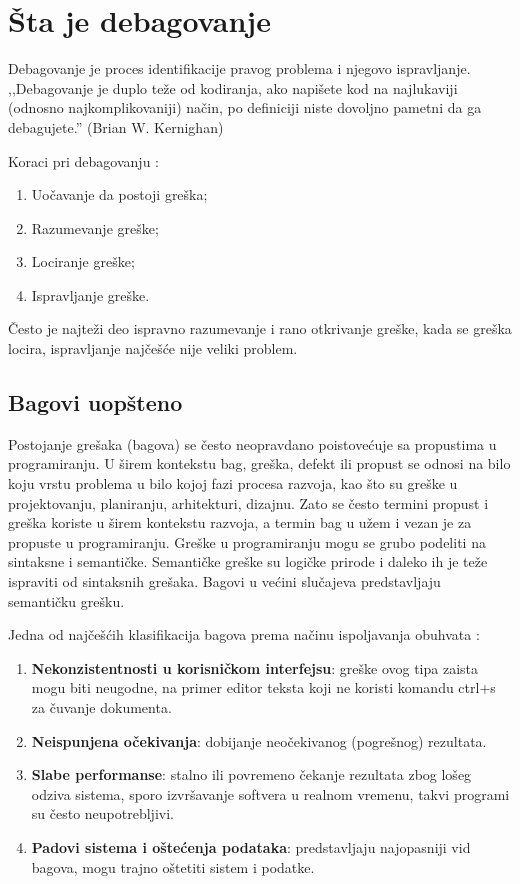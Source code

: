 \documentclass[a4paper]{article}
\begin{document}
\section{Šta je debagovanje}
\label{sec:sta je debagovanje}

Debagovanje je proces identifikacije pravog problema i njegovo ispravljanje.
,,Debagovanje je duplo teže od kodiranja, ako napišete kod na najlukaviji
(odnosno najkomplikovaniji) način, po definiciji niste dovoljno pametni da ga
debagujete.'' (Brian W. Kernighan) \cite{debagovanje_vladaf}


Koraci pri debagovanju \cite{bagovi_smalkov}:
\begin{enumerate}
\item Uočavanje da postoji greška;
\item Razumevanje greške;
\item Lociranje greške;
\item Ispravljanje greške.
\end{enumerate}

Često je najteži deo ispravno razumevanje i rano otkrivanje greške, kada se greška locira, ispravljanje najčešće nije veliki problem.


\subsection{Bagovi uopšteno}
\label{subsec:podnaslov1}

Postojanje grešaka (bagova) se često neopravdano poistovećuje sa propustima u programiranju.  U širem kontekstu bag, greška, defekt ili propust se odnosi na bilo koju vrstu problema u bilo kojoj fazi procesa razvoja, kao što su greške u projektovanju, planiranju, arhitekturi, dizajnu. Zato se često termini propust i greška koriste u širem kontekstu razvoja, a termin bag u užem i vezan je za propuste u programiranju. Greške u programiranju mogu se grubo podeliti na sintaksne i semantičke. Semantičke greške su logičke prirode i daleko ih je teže ispraviti od sintaksnih grešaka. Bagovi u većini slučajeva predstavljaju semantičku grešku.

Jedna od najčešćih klasifikacija bagova prema načinu ispoljavanja obuhvata \cite{bagovi_smalkov}:
\begin{enumerate}
	\item \textbf{Nekonzistentnosti u korisničkom interfejsu}: greške ovog tipa zaista mogu biti neugodne, na primer editor teksta koji ne koristi komandu ctrl+s za čuvanje dokumenta.
	\item \textbf{Neispunjena očekivanja}: dobijanje neočekivanog (pogrešnog) rezultata.
	\item \textbf{Slabe performanse}: stalno ili povremeno čekanje rezultata zbog lošeg odziva sistema, sporo izvršavanje softvera u realnom vremenu, takvi programi su često neupotrebljivi.
	\item \textbf{Padovi sistema i oštećenja podataka}: predstavljaju najopasniji vid bagova, mogu trajno oštetiti sistem i podatke.
\end{enumerate}
\end{document}
